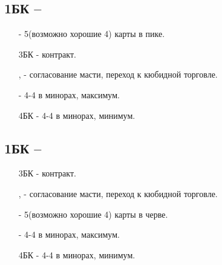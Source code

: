 \documentclass{article}
\begin{document}
\subsection{1БК -- }
\begin{enumerate}
    \item[\sp{3}] - 5(возможно хорошие 4) карты в пике. 
    \item[3БК] - контракт.
    \item[\cl{4}, \di{4}] - согласование масти, переход к кюбидной торговле.
    \item[\he{4}] - 4-4 в минорах, максимум.
    \item[4БК] - 4-4 в минорах, минимум.
\end{enumerate}
\subsection{1БК -- }
\begin{enumerate}
    \item[3БК] - контракт.
    \item[\cl{4}, \di{4}] - согласование масти, переход к кюбидной торговле.
    \item[\he{4}] - 5(возможно хорошие 4) карты в черве. 
    \item[\sp{4}] - 4-4 в минорах, максимум.
    \item[4БК] - 4-4 в минорах, минимум.
\end{enumerate}
\end{document}
